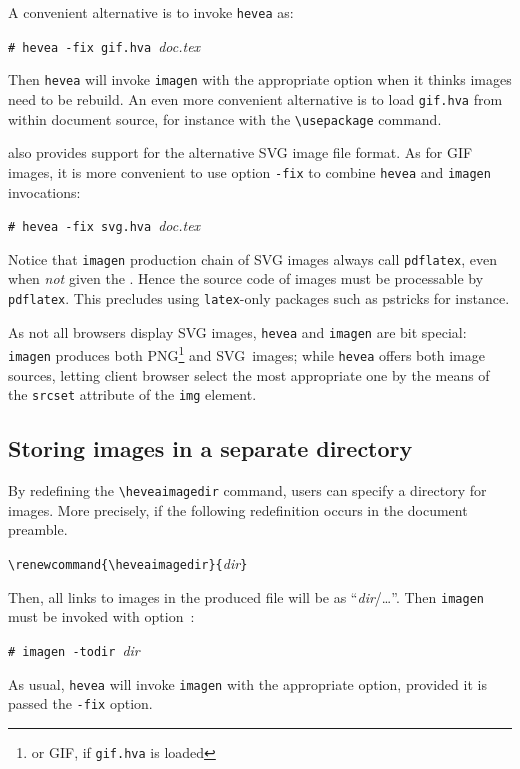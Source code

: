 A convenient alternative is to invoke \texttt{hevea} as:
\begin{flushleft}
\texttt{\#~hevea~-fix~gif.hva}~\textit{doc.tex}
\end{flushleft}
Then \texttt{hevea} will invoke \texttt{imagen} with the appropriate
option when it thinks images need to be rebuild.
An even more convenient alternative is to load \texttt{gif.hva}
from within document source, for instance with the \verb+\usepackage+
command.

\hevea{} also  provides support for the alternative SVG image file format.
As for GIF images, it is more convenient to use option \texttt{-fix}
to combine \texttt{hevea} and \texttt{imagen} invocations:
\begin{flushleft}
\texttt{\#~hevea~-fix~svg.hva}~\textit{doc.tex}
\end{flushleft}
Notice that \texttt{imagen} production chain of SVG images always
call \texttt{pdflatex}, even when \emph{not} given
the .
Hence the source code of images must be processable
by \texttt{pdflatex}. This precludes using \texttt{latex}-only packages
such as pstricks for instance.

As not all browsers display SVG images, \texttt{hevea} and
\texttt{imagen} are  bit special:
\texttt{imagen} produces both PNG\footnote{or GIF, if \texttt{gif.hva} is loaded} and SVG~images; while \texttt{hevea} offers both image sources,
letting client browser select the most appropriate one by the means of
the \verb+srcset+ attribute of the \verb+img+ element.

\subsection{Storing images in a separate directory} 
By redefining the \verb+\heveaimagedir+ command, users can specify a
directory for images.
More precisely, if the following redefinition occurs in the document
preamble.
\begin{flushleft}
\verb+\renewcommand{\heveaimagedir}{+\textit{dir}\verb+}+
\end{flushleft}
Then, all links to images in the produced \html{} file will be as
``\textit{dir}/\ldots''.
Then \texttt{imagen} must be invoked with option~:
\begin{flushleft}
\texttt{\#~imagen~-todir}~\textit{dir}~
\end{flushleft}
As usual, \texttt{hevea} will invoke \texttt{imagen} with the
appropriate option, provided it is passed the \texttt{-fix} option.


